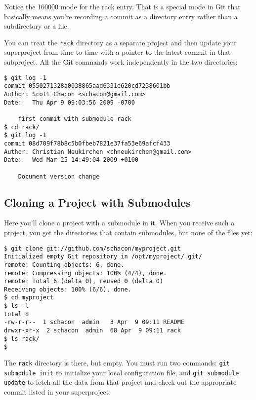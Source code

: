 \documentclass[a4paper]{book}
\begin{document}
Notice the 160000 mode for the rack entry. That is a special mode in Git that basically means you're recording a commit as a directory entry rather than a subdirectory or a file.

You can treat the \texttt{rack} directory as a separate project and then update your superproject from time to time with a pointer to the latest commit in that subproject. All the Git commands work independently in the two directories:

\begin{shaded}\begin{verbatim}
$ git log -1
commit 0550271328a0038865aad6331e620cd7238601bb
Author: Scott Chacon <schacon@gmail.com>
Date:   Thu Apr 9 09:03:56 2009 -0700

    first commit with submodule rack
$ cd rack/
$ git log -1
commit 08d709f78b8c5b0fbeb7821e37fa53e69afcf433
Author: Christian Neukirchen <chneukirchen@gmail.com>
Date:   Wed Mar 25 14:49:04 2009 +0100

    Document version change
\end{verbatim}\end{shaded}

\subsection{Cloning a Project with Submodules}\label{cloning-a-project-with-submodules}

Here you'll clone a project with a submodule in it. When you receive such a project, you get the directories that contain submodules, but none of the files yet:

\begin{shaded}\begin{verbatim}
$ git clone git://github.com/schacon/myproject.git
Initialized empty Git repository in /opt/myproject/.git/
remote: Counting objects: 6, done.
remote: Compressing objects: 100% (4/4), done.
remote: Total 6 (delta 0), reused 0 (delta 0)
Receiving objects: 100% (6/6), done.
$ cd myproject
$ ls -l
total 8
-rw-r-r--  1 schacon  admin   3 Apr  9 09:11 README
drwxr-xr-x  2 schacon  admin  68 Apr  9 09:11 rack
$ ls rack/
$
\end{verbatim}\end{shaded}

The \texttt{rack} directory is there, but empty. You must run two commands: \texttt{git submodule init} to initialize your local configuration file, and \texttt{git submodule update} to fetch all the data from that project and check out the appropriate commit listed in your superproject:
\end{document}
